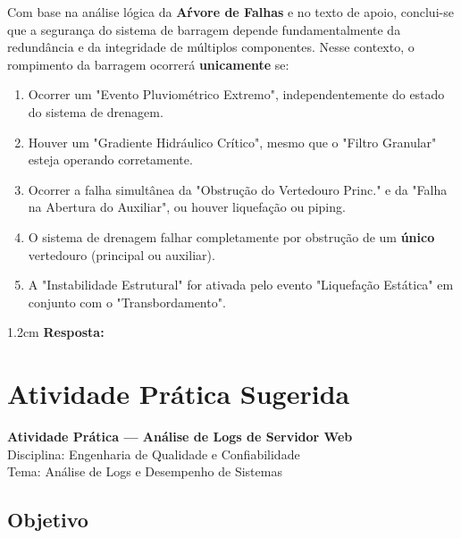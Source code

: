 \documentclass[12pt,a4paper,twoside]{report}
\begin{document}
Com base na an\'alise l\'ogica da \textbf{A\'rvore de Falhas} e no texto de apoio, conclui-se que a seguran\c{c}a do sistema de barragem depende fundamentalmente da redund\^ancia e da integridade de m\'ultiplos componentes. Nesse contexto, o rompimento da barragem ocorrer\'a \textbf{unicamente} se:

\begin{enumerate}[label=\Alph*)]
  \item Ocorrer um "Evento Pluviom\'etrico Extremo", independentemente do estado do sistema de drenagem.
  \item Houver um "Gradiente Hidr\'aulico Cr\'itico", mesmo que o "Filtro Granular" esteja operando corretamente.
  \item Ocorrer a falha simult\^anea da "Obstru\c{c}\~ao do Vertedouro Princ." e da "Falha na Abertura do Auxiliar", ou houver liquefação ou piping.
  \item O sistema de drenagem falhar completamente por obstrução de um \textbf{único} vertedouro (principal ou auxiliar).
  \item A "Instabilidade Estrutural" for ativada pelo evento "Liquefa\c{c}\~ao Est\'atica" em conjunto com o "Transbordamento".
\end{enumerate}

\begin{resposta}{1.2cm}
  \textbf{Resposta:}
\end{resposta}

\vspace{0.5cm}
\vspace{0.5cm}

\chapter{Atividade Prática Sugerida}



\begin{center}
\Large \textbf{Atividade Prática — Análise de Logs de Servidor Web} \\

\normalsize Disciplina: Engenharia de Qualidade e Confiabilidade \\

\normalsize Tema: Análise de Logs e Desempenho de Sistemas
\end{center}

\vspace{0.5cm}

\section*{Objetivo}
\end{document}
